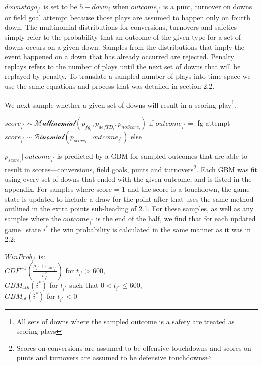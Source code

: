 \documentclass[12pt,twoside]{dukestatscithesis}
\begin{document}
\(downstogo_{i^*}\) is set to be \(5 - down_i\) when \(outcome_{i^*}\) is a punt, turnover on downs or field goal attempt because those plays are assumed to happen only on fourth down. The multinomial distributions for conversions, turnovers and safeties simply refer to the probability that an outcome of the given type for a set of downs occurs on a given down. Samples from the distributions that imply the event happened on a down that has already occurred are rejected. Penalty replays refers to the number of plays until the next set of downs that will be replayed by penalty. To translate a sampled number of plays into time space we use the same equations and process that was detailed in section 2.2.

We next sample whether a given set of downs will result in a scoring play\footnote{All sets of downs where the sampled outcome is a safety are treated as scoring plays}.

\(score_{i^*} \sim \mathcal{Multinomial}(p_{fg_i}, p_{defTD_i}, p_{noScore_i})\) if \(outcome_{i^*} =\) fg attempt
\(score_{i^*} \sim \mathcal{Binomial}(p_{score_i} \: | \:outcome_{i^*})\) else

\(p_{score_i} | \:outcome_{i^*}\) is predicted by a GBM for sampled outcomes that are able to result in scores---conversions, field goals, punts and turnovers\footnote{Scores on conversions are assumed to be offensive touchdowns and scores on punts and turnovers are assumed to be defensive touchdowns}. Each GBM was fit using every set of downs that ended with the given outcome, and is listed in the appendix. For samples where score = 1 and the score is a touchdown, the game state is updated to include a draw for the point after that uses the same method outlined in the extra points sub-heading of 2.1. For these samples, as well as any samples where the \(outcome_{i^*}\) is the end of the half, we find that for each updated game\_state \(i^*\) the win probability is calculated in the same manner as it was in 2.2:

\(WinProb_{i^*}\) is:\\
\(CDF^{-1}(\frac{\hat{\mu}_{i^*} + s_{curr_{i^*}}}{\hat{\sigma}^{2}_{i^*}})\) for \(t_{i^*} > 600\),\\
\(GBM_{4th}(i^*)\) for \(t_{i^*}\) such that \(0 < t_{i^*} \leq 600\),\\
\(GBM_{ot}(i^*)\) for \(t_{i^*} < 0\)
\end{document}
